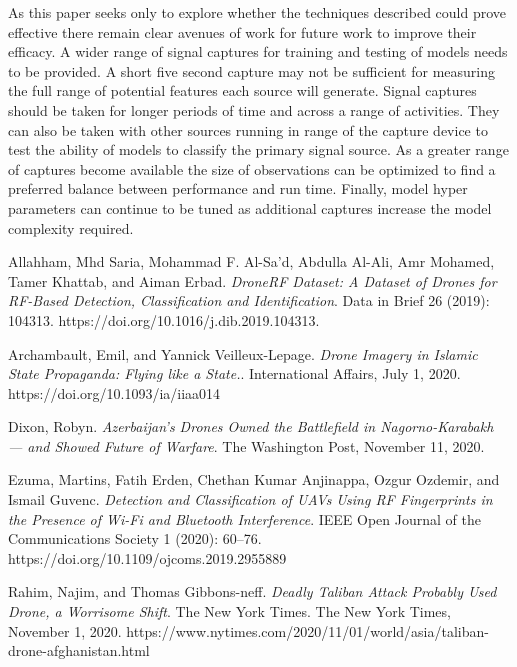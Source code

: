 \documentclass[12pt]{article}
\begin{document}
As this paper seeks only to explore whether the techniques described could prove effective there remain clear avenues of work for future work to improve their efficacy. A wider range of signal captures for training and testing of models needs to be provided. A short five second capture may not be sufficient for measuring the full range of potential features each source will generate. Signal captures should be taken for longer periods of time and across a range of activities. They can also be taken with other sources running in range of the capture device to test the ability of models to classify the primary signal source. As a greater range of captures become available the size of observations can be optimized to find a preferred balance between performance and run time. Finally, model hyper parameters can continue to be tuned as additional captures increase the model complexity required.

\begin{thebibliography}{5}
	Allahham, Mhd Saria, Mohammad F. Al-Sa'd, Abdulla Al-Ali, Amr Mohamed, Tamer Khattab, and Aiman Erbad. 
	\textit{DroneRF Dataset: A Dataset of Drones for RF-Based Detection, Classification and Identification}. 
	 Data in Brief 26 (2019): 104313. https://doi.org/10.1016/j.dib.2019.104313.
	 
	Archambault, Emil, and Yannick Veilleux-Lepage. 
	\textit{Drone Imagery in Islamic State Propaganda: Flying like a State.}.
	International Affairs, July 1, 2020. https://doi.org/10.1093/ia/iiaa014
	
	Dixon, Robyn.
	\textit{Azerbaijan’s Drones Owned the Battlefield in Nagorno-Karabakh — and Showed Future of Warfare}.
	The Washington Post, November 11, 2020.
	
	Ezuma, Martins, Fatih Erden, Chethan Kumar Anjinappa, Ozgur Ozdemir, and Ismail Guvenc. 
	\textit{Detection and Classification of UAVs Using RF Fingerprints in the Presence of Wi-Fi and Bluetooth Interference}.
	IEEE Open Journal of the Communications Society 1 (2020): 60–76. https://doi.org/10.1109/ojcoms.2019.2955889
	
	Rahim, Najim, and Thomas Gibbons-neff. 
	\textit{Deadly Taliban Attack Probably Used Drone, a Worrisome Shift}.
	The New York Times. The New York Times, November 1, 2020. https://www.nytimes.com/2020/11/01/world/asia/taliban-drone-afghanistan.html
\end{thebibliography}
\end{document}
